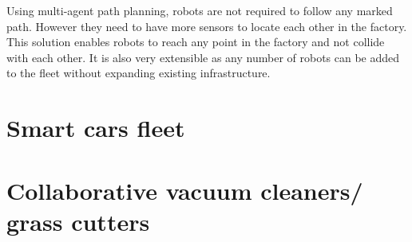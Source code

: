 Using multi-agent path planning, robots are not required to follow any marked path. However they need to have more sensors to locate each other in the factory. This solution enables robots to reach any point in the factory and not collide with each other. It is also very extensible as any number of robots can be added to the fleet without expanding existing infrastructure.

\section{Smart cars fleet}

\section{Collaborative vacuum cleaners/ grass cutters}